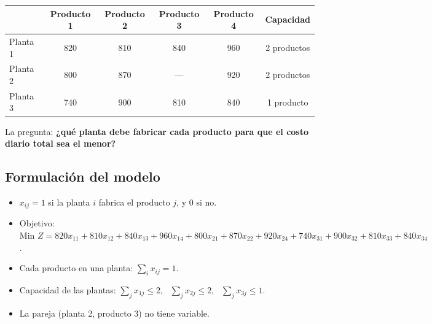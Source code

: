 \documentclass[11pt,a4paper]{article}
\begin{document}
\begin{center}
\begin{tabular}{lccccc}
\toprule
 & \textbf{Producto 1} & \textbf{Producto 2} & \textbf{Producto 3} & \textbf{Producto 4} & \textbf{Capacidad} \\
\midrule
Planta 1 & 820 & 810 & 840 & 960 & 2 productos \\
Planta 2 & 800 & 870 & --- & 920 & 2 productos \\
Planta 3 & 740 & 900 & 810 & 840 & 1 producto \\
\bottomrule
\end{tabular}
\end{center}

La pregunta: \textbf{¿qué planta debe fabricar cada producto para que el costo diario total sea el menor?}

\subsection*{Formulación del modelo}
\begin{itemize}[itemsep=2pt]
  \item $x_{ij} = 1$ si la planta $i$ fabrica el producto $j$, y 0 si no.
  \item Objetivo: $\text{Min } Z = 820x_{11} + 810x_{12} + 840x_{13} + 960x_{14} + 800x_{21} + 870x_{22} + 920x_{24} + 740x_{31} + 900x_{32} + 810x_{33} + 840x_{34}$.
  \item Cada producto en una planta: $\sum_i x_{ij} = 1$.
  \item Capacidad de las plantas: $\sum_j x_{1j} \le 2$, \ $\sum_j x_{2j} \le 2$, \ $\sum_j x_{3j} \le 1$.
  \item La pareja (planta 2, producto 3) no tiene variable.
\end{itemize}
\end{document}
